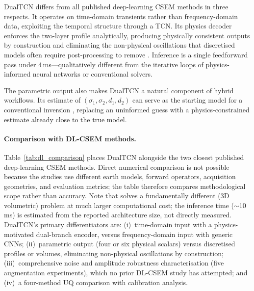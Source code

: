 \documentclass[journal]{IEEEtran}
\begin{document}
DualTCN differs from all published deep-learning CSEM methods in
three respects. It operates on time-domain transients rather than
frequency-domain data, exploiting the temporal structure through a
TCN. Its physics decoder enforces the two-layer profile analytically,
producing physically consistent outputs by construction and
eliminating the non-physical oscillations that discretised models
often require post-processing to remove \citep{zhang2024_3d}.
Inference is a single feedforward pass under 4\,ms---qualitatively
different from the iterative loops of physics-informed neural
networks \citep{raissi2019physics} or conventional solvers.

The parametric output also makes DualTCN a natural component of
hybrid workflows. Its estimate of
$(\sigma_1, \sigma_2, d_1, d_2)$ can serve as the starting model
for a conventional inversion \citep{araya2018deep}, replacing an
uninformed guess with a physics-constrained estimate already close to
the true model.

\paragraph{Comparison with DL-CSEM methods.}
Table~\ref{tab:dl_comparison} places DualTCN alongside the two
closest published deep-learning CSEM methods.  Direct numerical
comparison is not possible because the studies use different earth
models, forward operators, acquisition geometries, and evaluation
metrics; the table therefore compares methodological scope rather than
accuracy.  Note that \citet{zhang2024_3d} solves a fundamentally
different (3D volumetric) problem at much larger computational cost;
the \citet{puzyrev2019deep} inference time ($\sim$10\,ms) is
estimated from the reported architecture size, not directly measured.  DualTCN's primary differentiators are: (i)~time-domain
input with a physics-motivated dual-branch encoder, versus
frequency-domain input with generic CNNs; (ii)~parametric output
(four or six physical scalars) versus discretised profiles or
volumes, eliminating non-physical oscillations by construction;
(iii)~comprehensive noise and amplitude robustness characterisation
(five augmentation experiments), which no prior DL-CSEM study has
attempted; and (iv)~a four-method UQ comparison with calibration
analysis.
\end{document}
